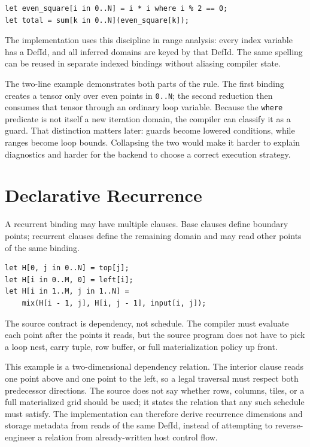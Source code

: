 \begin{lstlisting}[style=einlang]
let even_square[i in 0..N] = i * i where i % 2 == 0;
let total = sum[k in 0..N](even_square[k]);
\end{lstlisting}

The implementation uses this discipline in range analysis: every index variable
has a DefId, and all inferred domains are keyed by that DefId. The same spelling
can be reused in separate indexed bindings without aliasing compiler state.

The two-line example demonstrates both parts of the rule. The first binding
creates a tensor only over even points in \texttt{0..N}; the second reduction
then consumes that tensor through an ordinary loop variable. Because the
\texttt{where} predicate is not itself a new iteration domain, the compiler can
classify it as a guard. That distinction matters later: guards become lowered
conditions, while ranges become loop bounds. Collapsing the two would make it
harder to explain diagnostics and harder for the backend to choose a correct
execution strategy.

\section{Declarative Recurrence}

A recurrent binding may have multiple clauses. Base clauses define boundary
points; recurrent clauses define the remaining domain and may read other points
of the same binding.

\begin{lstlisting}[style=einlang]
let H[0, j in 0..N] = top[j];
let H[i in 0..M, 0] = left[i];
let H[i in 1..M, j in 1..N] =
    mix(H[i - 1, j], H[i, j - 1], input[i, j]);
\end{lstlisting}

The source contract is dependency, not schedule. The compiler must evaluate each
point after the points it reads, but the source program does not have to pick a
loop nest, carry tuple, row buffer, or full materialization policy up front.

This example is a two-dimensional dependency relation. The interior clause
reads one point above and one point to the left, so a legal traversal must
respect both predecessor directions. The source does not say whether rows,
columns, tiles, or a full materialized grid should be used; it states the
relation that any such schedule must satisfy. The implementation can therefore
derive recurrence dimensions and storage metadata from reads of the same DefId,
instead of attempting to reverse-engineer a relation from already-written host
control flow.

